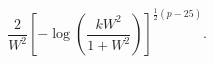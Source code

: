 \begin{equation}
  \frac{2}{W^2}\left[-\log\left( \frac{k W^2}{1+W^2}
  \right)\right]^{\tfrac{1}{2}(p-25)}.
\end{equation}

